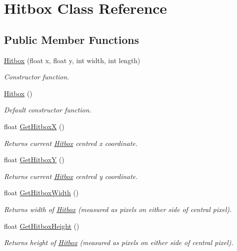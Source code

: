 \hypertarget{class_hitbox}{}\section{Hitbox Class Reference}
\label{class_hitbox}
\subsection*{Public Member Functions}
\begin{DoxyCompactItemize}
\item 
\hyperlink{class_hitbox_acb9da54b168b9e457b01387ba4ddfe02}{Hitbox} (float x, float y, int width, int length)
\begin{DoxyCompactList}\small\item\em Constructor function. \end{DoxyCompactList}\item 
\hyperlink{class_hitbox_a999b0be8486978b3dd7bcd001c7c3c03}{Hitbox} ()
\begin{DoxyCompactList}\small\item\em Default constructor function. \end{DoxyCompactList}\item 
float \hyperlink{class_hitbox_afa9e21136ddd399793bbd375af5f16cc}{Get\+HitboxX} ()
\begin{DoxyCompactList}\small\item\em Returns current \hyperlink{class_hitbox}{Hitbox} centred x coordinate. \end{DoxyCompactList}\item 
float \hyperlink{class_hitbox_af1fbffe46fd19d47019514744144fa1d}{Get\+HitboxY} ()
\begin{DoxyCompactList}\small\item\em Returns current \hyperlink{class_hitbox}{Hitbox} centred y coordinate. \end{DoxyCompactList}\item 
float \hyperlink{class_hitbox_a318a7a3694024fa394b8d35ecd36ccdd}{Get\+Hitbox\+Width} ()
\begin{DoxyCompactList}\small\item\em Returns width of \hyperlink{class_hitbox}{Hitbox} (measured as pixels on either side of central pixel). \end{DoxyCompactList}\item 
float \hyperlink{class_hitbox_ac500587c4afac7159161affbbd46f3b3}{Get\+Hitbox\+Height} ()
\begin{DoxyCompactList}\small\item\em Returns height of \hyperlink{class_hitbox}{Hitbox} (measured as pixels on either side of central pixel). \end{DoxyCompactList}\item 

\end{DoxyCompactItemize}
